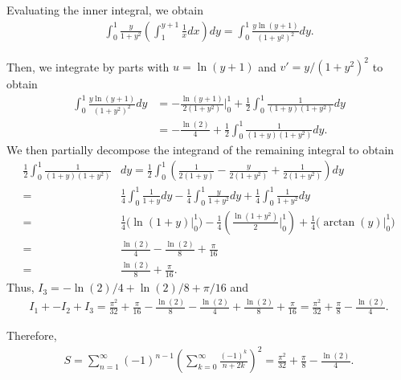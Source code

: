 \documentclass{article}
\begin{document}
Evaluating the inner integral, we obtain
\begin{align*}
   \int_{0}^{1}\frac{y}{1+y^2}\left(\int_{1}^{y+1}\frac{1}{x}dx\right)dy=\int_{0}^{1}\frac{y\ln(y+1)}{(1+y^2)^2}dy.
\end{align*}

Then, we integrate by parts with $u=\ln(y+1)$ and $v'=y/(1+y^2)^2$ to obtain
\begin{align*}
   \int_{0}^{1}\frac{y\ln(y+1)}{(1+y^2)^2}dy&=-\frac{\ln(y+1)}{2(1+y^2)}\Big|_0^1+\frac{1}{2}\int_{0}^{1}\frac{1}{(1+y)(1+y^2)}dy \\
   &=-\frac{\ln(2)}{4}+\frac{1}{2}\int_{0}^{1}\frac{1}{(1+y)(1+y^2)}dy. 
\end{align*}
We then partially decompose the integrand of the remaining integral to obtain
\begin{align*}
  \frac{1}{2}\int_{0}^{1}\frac{1}{(1+y)(1+y^2)}&dy =\frac{1}{2}\int_0^1\left(\frac{1}{2(1+y)}-\frac{y}{2(1+y^2)}+\frac{1}{2(1+y^2)}\right)dy\\
   =&\frac{1}{4}\int_0^1\frac{1}{1+y}dy-\frac{1}{4}\int_0^1\frac{y}{1+y^2}dy+\frac{1}{4}\int_0^1\frac{1}{1+y^2}dy \\
   =&\frac{1}{4}\Big(\ln(1+y)\Big|_0^1\Big)-\frac{1}{4}\left(\frac{\ln(1+y^2)}{2}\Big|_0^1\right)+\frac{1}{4}\Big(\arctan(y)\Big|_0^1\Big) \\
   =&\frac{\ln(2)}{4}-\frac{\ln(2)}{8}+\frac{\pi}{16} \\
   =&\frac{\ln(2)}{8}+\frac{\pi}{16}.
\end{align*}
Thus, $I_3=-\ln(2)/4+\ln(2)/8+\pi/16$ and
\begin{align*}
  I_1+-I_2+I_3=\frac{\pi^2}{32}+\frac{\pi}{16}-\frac{\ln(2)}{8}-\frac{\ln(2)}{4}+\frac{\ln(2)}{8}+\frac{\pi}{16}=\frac{\pi^2}{32}+\frac{\pi}{8}-\frac{\ln(2)}{4}.
\end{align*}

\vspace{5mm}

Therefore,
\begin{align*}
  S=\sum_{n=1}^{\infty}(-1)^{n-1}\left(\sum_{k=0}^{\infty}\frac{(-1)^k}{n+2k}\right)^2=\frac{\pi^2}{32}+\frac{\pi}{8}-\frac{\ln(2)}{4}.
\end{align*}
\end{document}
